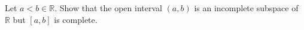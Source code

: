Let $a<b\in \mathbb{R}$. Show that the open interval $(a,b)$ is an incomplete subspace of $\mathbb{R}$
but $[a,b]$ is complete.\\